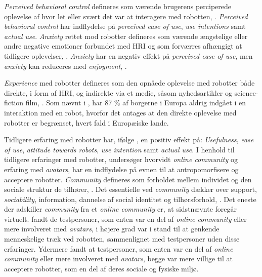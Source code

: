 \textit{Perceived behavioral control} defineres som værende brugerens perciperede oplevelse af hvor let eller svært det var at interagere med robotten, \parencite[s. 1478]{PDF:ExploringInfluencingVariable}. \textit{Perceived behavioral control} har indflydelse på \textit{perceived ease of use}, \textit{use intentions} samt \textit{actual use}. \textit{Anxiety} rettet mod robotter defineres som værende ængstelige eller andre negative emotioner forbundet med HRI og som forværres afhængigt at tidligere oplevelser, \parencite[s. 1478]{PDF:ExploringInfluencingVariable}. \textit{Anxiety} har en negativ effekt på \textit{perceived ease of use}, men \textit{anxiety} kan reduceres med \textit{enjoyment}, \parencite[s. 1478]{PDF:ExploringInfluencingVariable}. 

\textit{Experience} med robotter defineres som den opnåede oplevelse med robotter både direkte, i form af HRI, og indirekte via et medie, såsom nyhedsartikler og science-fiction film, \parencite[s. 1479]{PDF:ExploringInfluencingVariable}. Som nævnt i , har 87 \% af borgerne i Europa aldrig indgået i en interaktion med en robot, hvorfor det antages at den direkte oplevelse med robotter er begrænset, hvert fald i Europæiske lande.

Tidligere erfaring med robotter har, ifølge \textcite[s. 1479]{PDF:ExploringInfluencingVariable}, en positiv effekt på: \textit{Usefulness}, \textit{ease of use}, \textit{attitude towards robots}, \textit{use intention} samt \textit{actual use}. I henhold til tidligere erfaringer med robotter, undersøger \textcite{PDF:CloseButNotStuck} hvorvidt \textit{online community} og erfaring med \textit{avatars}, har en indflydelse på evnen til at antropomorfisere og acceptere robotter. \textit{Community} defineres som forholdet mellem individet og den sociale struktur de tilhører, \parencite[ss. 20-21]{PDF:CloseButNotStuck}. Det essentielle ved \textit{community} dækker over support, \textit{sociability}, information, dannelse af social identitet og tilhørsforhold, \parencite[s. 21]{PDF:CloseButNotStuck}. Det eneste der adskiller \textit{community} fra et \textit{online community} er, at sidstnævnte foregår virtuelt. \textcite[s. 25]{PDF:CloseButNotStuck} fandt de testpersoner, som enten var en del af \textit{online community} eller mere involveret med \textit{avatars}, i højere grad var i stand til at genkende menneskelige træk ved robotten, sammenlignet med testpersoner uden disse erfaringer. Ydermere fandt \textcite[s. 26]{PDF:CloseButNotStuck} at testpersoner, som enten var en del af \textit{online community} eller mere involveret med \textit{avatars}, begge var mere villige til at acceptere robotter, som en del af deres sociale og fysiske miljø.  
%

